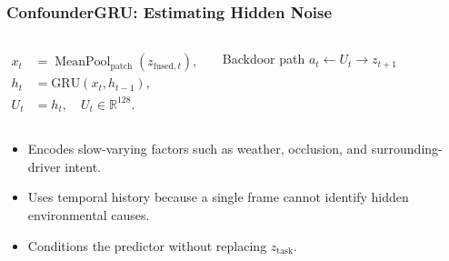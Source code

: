 \begin{frame}
  \frametitle{ConfounderGRU: Estimating Hidden Noise}
  \begin{columns}[T,onlytextwidth]
    \vspace{0pt}
    \begin{align*}
      x_t &= \operatorname{MeanPool}_{\mathrm{patch}}(z_{\mathrm{fused},t}),\\
      h_t &= \mathrm{GRU}(x_t,h_{t-1}),\\
      U_t &= h_t,\quad U_t\in\mathbb{R}^{128}.
    \end{align*}
    \vspace{0pt}
    \begin{block}{Backdoor path}
      $a_t \leftarrow U_t \rightarrow z_{t+1}$
    \end{block}
  \end{columns}
  \vspace{0.3em}
  \begin{itemize}
    \item Encodes slow-varying factors such as weather, occlusion, and surrounding-driver intent.
    \item Uses temporal history because a single frame cannot identify hidden environmental causes.
    \item Conditions the predictor without replacing $z_{\text{task}}$.
  \end{itemize}
\end{frame}

